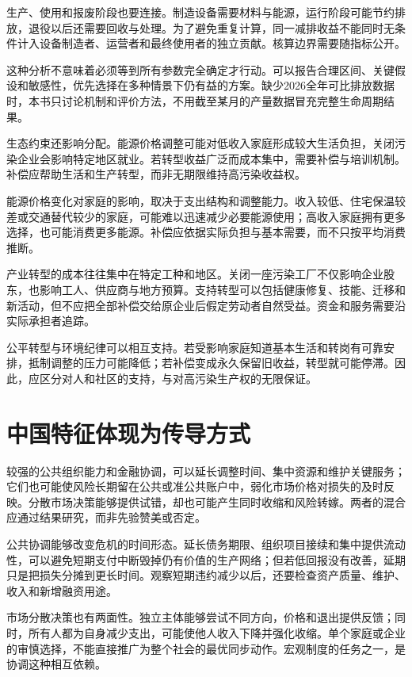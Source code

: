 \documentclass[UTF8,fontset=fandol,zihao=-4,oneside,openany]{ctexbook}
\begin{document}
生产、使用和报废阶段也要连接。制造设备需要材料与能源，运行阶段可能节约排放，退役以后还需要回收与处理。为了避免重复计算，同一减排收益不能同时无条件计入设备制造者、运营者和最终使用者的独立贡献。核算边界需要随指标公开。

这种分析不意味着必须等到所有参数完全确定才行动。可以报告合理区间、关键假设和敏感性，优先选择在多种情景下仍有益的方案。缺少2026全年可比排放数据时，本书只讨论机制和评价方法，不用截至某月的产量数据冒充完整生命周期结果。

生态约束还影响分配。能源价格调整可能对低收入家庭形成较大生活负担，关闭污染企业会影响特定地区就业。若转型收益广泛而成本集中，需要补偿与培训机制。补偿应帮助生活和生产转型，而非无期限维持高污染收益权。

\label{arg:P240}
能源价格变化对家庭的影响，取决于支出结构和调整能力。收入较低、住宅保温较差或交通替代较少的家庭，可能难以迅速减少必要能源使用；高收入家庭拥有更多选择，也可能消费更多能源。补偿应依据实际负担与基本需要，而不只按平均消费推断。

产业转型的成本往往集中在特定工种和地区。关闭一座污染工厂不仅影响企业股东，也影响工人、供应商与地方预算。支持转型可以包括健康修复、技能、迁移和新活动，但不应把全部补偿交给原企业后假定劳动者自然受益。资金和服务需要沿实际承担者追踪。

公平转型与环境纪律可以相互支持。若受影响家庭知道基本生活和转岗有可靠安排，抵制调整的压力可能降低；若补偿变成永久保留旧收益，转型就可能停滞。因此，应区分对人和社区的支持，与对高污染生产权的无限保证。

\section{中国特征体现为传导方式}
较强的公共组织能力和金融协调，可以延长调整时间、集中资源和维护关键服务；它们也可能使风险长期留在公共或准公共账户中，弱化市场价格对损失的及时反映。分散市场决策能够提供试错，却也可能产生同时收缩和风险转嫁。两者的混合应通过结果研究，而非先验赞美或否定。

\label{arg:P241}
公共协调能够改变危机的时间形态。延长债务期限、组织项目接续和集中提供流动性，可以避免短期支付中断毁掉仍有价值的生产网络；但若低回报没有改善，延期只是把损失分摊到更长时间。观察短期违约减少以后，还要检查资产质量、维护、收入和新增融资用途。

市场分散决策也有两面性。独立主体能够尝试不同方向，价格和退出提供反馈；同时，所有人都为自身减少支出，可能使他人收入下降并强化收缩。单个家庭或企业的审慎选择，不能直接推广为整个社会的最优同步动作。宏观制度的任务之一，是协调这种相互依赖。
\end{document}
